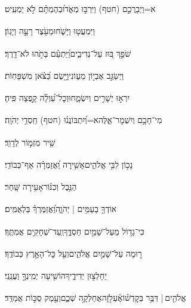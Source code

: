 \documentclass[12pt]{article}
\newcommand{\loc}[1]{\textsuperscript{\locf{#1}}}
\begin{document}
{\loc{ לח}~}‏א=וַיְבָרֲכֵ֣ם (חטף) וַיִּרְבּ֣וּ מְאֹ֑ד{\hfill}וּ֝בְהֶמְתָּ֗ם לֹ֣א יַמְעִֽיט׃\par

{\loc{ לט}~}‏וַיִּמְעֲט֥וּ וַיָּשֹׁ֑חוּ{\hfill}מֵעֹ֖צֶר רָעָ֣ה וְיָגֽוֹן׃\par

{\loc{ מ}~}‏שֹׁפֵ֣ךְ בּ֭וּז עַל־נְדִיבִ֑ים{\hfill}וַ֝יַּתְעֵ֗ם בְּתֹ֣הוּ לֹא־דָֽרֶךְ׃\par

{\loc{ מא}~}‏וַיְשַׂגֵּ֣ב אֶבְי֣וֹן מֵע֑וֹנִי{\hfill}וַיָּ֥שֶׂם כַּ֝צֹּ֗אן מִשְׁפָּחֽוֹת׃\par

{\loc{ מב}~}‏יִרְא֣וּ יְשָׁרִ֣ים וְיִשְׂמָ֑חוּ{\hfill}וְכׇל־עַ֝וְלָ֗ה קָ֣פְצָה פִּֽיהָ׃\par

{\loc{ מג}~}‏מִי־חָכָ֥ם וְיִשְׁמׇר־אֵ֑לֶּה{\hfill}א=וְ֝יִתְבּוֹנֲנ֗וּ (חטף) חַֽסְדֵ֥י יְהֹוָֽה׃\par\pend
\ledpb
\pstart[\subsection*{\textcolor{red}{פרק קח}}]\label{פרק קח}
{\loc{ א}~}‏שִׁ֖יר מִזְמ֣וֹר לְדָוִֽד׃\par

{\loc{ ב}~}‏נָכ֣וֹן לִבִּ֣י אֱלֹהִ֑ים{\hfill}אָשִׁ֥ירָה וַ֝אֲזַמְּרָ֗ה אַף־כְּבוֹדִֽי׃\par

{\loc{ ג}~}‏ הַנֵּ֥בֶל וְכִנּ֗וֹר{\hfill}אָעִ֥ירָה שָּֽׁחַר׃\par

{\loc{ ד}~}‏אוֹדְךָ֖ בָעַמִּ֥ים | יְהֹוָ֑ה{\hfill}וַ֝אֲזַמֶּרְךָ֗ בַּלְאֻמִּֽים׃\par

{\loc{ ה}~}‏כִּי־גָד֣וֹל מֵעַל־שָׁמַ֣יִם חַסְדֶּ֑ךָ{\hfill}וְֽעַד־שְׁחָקִ֥ים אֲמִתֶּֽךָ׃\par

{\loc{ ו}~}‏ר֣וּמָה עַל־שָׁמַ֣יִם אֱלֹהִ֑ים{\hfill}וְעַ֖ל כׇּל־הָאָ֣רֶץ כְּבוֹדֶֽךָ׃\par

{\loc{ ז}~}‏ יֵחָלְצ֣וּן יְדִידֶ֑יךָ{\hfill}הוֹשִׁ֖יעָה יְמִֽינְךָ֣ וַעֲנֵֽנִי׃\par

{\loc{ ח}~}‏אֱלֹהִ֤ים |  דִּבֶּ֥ר בְּקׇדְשׁ֗וֹ{\hfill}אֶ֫עְלֹ֥זָה\newline\hspace*{.5em}אֲחַלְּקָ֥ה שְׁכֶ֑ם{\hfill}וְעֵ֖מֶק סֻכּ֣וֹת אֲמַדֵּֽד׃\par
\end{document}
